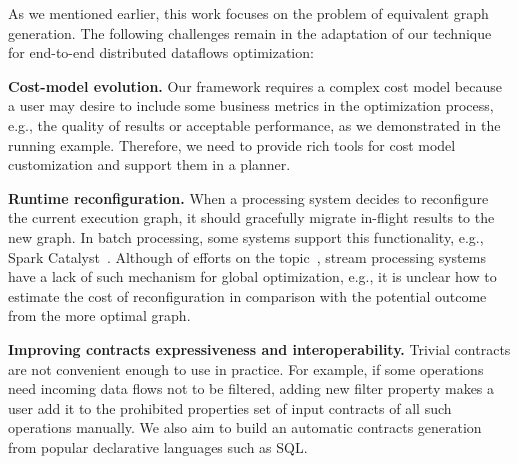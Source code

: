 As we mentioned earlier, this work focuses on the problem of equivalent graph generation. The following challenges remain in the adaptation of our technique for end-to-end distributed dataflows optimization:

\textbf{Cost-model evolution.}
Our framework requires a complex cost model because a user may desire to include some business metrics in the optimization process, e.g., the quality of results or acceptable performance, as we demonstrated in the running example. Therefore, we need to provide rich tools for cost model customization and support them in a planner. 

\textbf{Runtime reconfiguration.}
When a processing system decides to reconfigure the current execution graph, it should gracefully migrate in-flight results to the new graph. In batch processing, some systems support this functionality, e.g., Spark Catalyst~\cite{armbrust2015spark}. Although of efforts on the topic~\cite{10.14778/3329772.3329777, grulich2020grizzly}, stream processing systems have a lack of such mechanism for global optimization, e.g., it is unclear how to estimate the cost of reconfiguration in comparison with the potential outcome from the more optimal graph.

\textbf{Improving contracts expressiveness and interoperability.}
Trivial contracts are not convenient enough to use in practice.
For example, if some operations need incoming data flows not to be filtered, adding new filter property makes a user add it to the prohibited properties set of input contracts of all such operations manually. We also aim to build an automatic contracts generation from popular declarative languages such as SQL.








